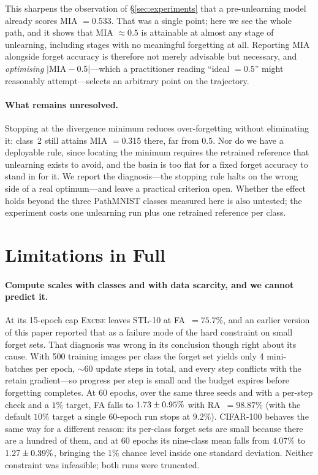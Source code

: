 \documentclass{article}
\newcommand{\ours}{\textsc{Excise}}
\newcommand{\rev}[1]{{\color{revisedB}#1}}
\theoremstyle{remark}
\theoremstyle{plain}
\begin{document}
This sharpens the observation of \S\ref{sec:experiments} that a pre-unlearning
model already scores MIA $=0.533$. That was a single point; here we see the
whole path, and it shows that MIA $\approx 0.5$ is attainable at almost any
stage of unlearning, including stages with no meaningful forgetting at all.
Reporting MIA alongside forget accuracy is therefore not merely advisable but
necessary, and \emph{optimising} $|\mathrm{MIA}-0.5|$---which a practitioner
reading ``ideal $=0.5$'' might reasonably attempt---selects an arbitrary point
on the trajectory.

\paragraph{What remains unresolved.}
Stopping at the divergence minimum reduces over-forgetting without eliminating
it: class~2 still attains MIA $=0.315$ there, far from $0.5$. Nor do we have a
deployable rule, since locating the minimum requires the retrained reference
that unlearning exists to avoid, and the basin is too flat for a fixed forget
accuracy to stand in for it. We report the diagnosis---the stopping rule halts
on the wrong side of a real optimum---and leave a practical criterion open.
Whether the effect holds beyond the three PathMNIST classes measured here is
also untested; the experiment costs one unlearning run plus one retrained
reference per class.

\section{Limitations in Full}\label{app:limitations}

\paragraph{Compute scales with classes and with data scarcity, and we cannot
predict it.} At \rev{its 15-epoch cap} \ours{} leaves STL-10 at
FA~$=75.7\%$, and an earlier version of this paper reported that as a failure
mode of the hard constraint on small forget sets. That diagnosis was wrong in
its conclusion though right about its cause. With 500 training images per class
the forget set yields only 4 mini-batches per epoch, ${\sim}60$ update steps in
total, and every step conflicts with the retain gradient---so progress per step
is small and the budget expires before forgetting completes. At 60 epochs, over
the same three seeds \rev{and with a per-step check and a $1\%$ target}, FA falls
to $1.73 \pm \rev{0.95}\%$ with RA~$=98.87\%$ \rev{(with the default $10\%$
target a single 60-epoch run stops at $9.2\%$)}. CIFAR-100
behaves the same way for a different reason: its per-class forget sets are small
because there are a hundred of them, and at 60 epochs its nine-class mean falls
from $4.07\%$ to $1.27 \pm \rev{0.39}\%$, bringing the $1\%$ chance level inside one
standard deviation. Neither constraint was infeasible; both runs were truncated.
\end{document}
